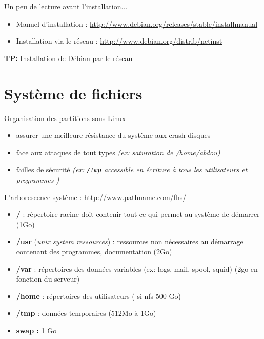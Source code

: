 \documentclass[french]{beamer}
\begin{document}
\begin{frame}
Un peu de lecture avant l'installation...
\begin{itemize}
\item Manuel d'installation : \url{http://www.debian.org/releases/stable/installmanual}
\item Installation via le réseau : \url{http://www.debian.org/distrib/netinst}
\end{itemize}
\textbf{TP:} Installation de Débian par le réseau
\end{frame} 

\section{Système de fichiers}
\frame{\tableofcontents[current]}

\begin{frame}
Organisation des partitions sous Linux
\begin{itemize}
\item assurer une meilleure résistance du système aux crash disques
\item face aux attaques de tout types \textit{(ex: saturation de /home/abdou)}
\item failles de sécurité \textit{(ex: \texttt{/tmp} accessible en écriture à tous les utilisateurs et programmes )}
\end{itemize}
\end{frame}


\begin{frame}
L'arborescence système : \url{http://www.pathname.com/fhs/}
    \begin{itemize}
    \item \textbf{/} : répertoire racine doit contenir tout ce qui permet au système de démarrer (1Go)
    \item \textbf{/usr} (\textit{unix system ressources}) : ressources non nécessaires au démarrage contenant des programmes, documentation (2Go)
    \item \textbf{/var} : répertoires des données variables (ex: logs, mail, spool, squid) (2go en fonction du serveur)
    \item \textbf{/home} : répertoires des utilisateurs ( si nfs 500 Go)
	\item \textbf{/tmp} : données temporaires (512Mo à 1Go)
	\item \textbf{swap :} 1 Go  
    \end{itemize}
 \end{frame}
 
\end{document}
